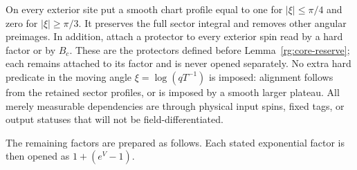 On every exterior site put a smooth chart profile equal to one for
$|\xi|\le\pi/4$ and zero for $|\xi|\ge\pi/3$.  It preserves the
full sector integral and removes other angular preimages.  In addition,
attach a protector to every exterior spin read by a hard factor or by
$B_c$.  These are the protectors defined before Lemma~\ref{rg:core-reserve};
each remains attached to its factor and is never opened separately.  No extra hard predicate in the moving angle
$\xi=\log(qT^{-1})$ is imposed: alignment follows from the retained
sector profiles, or is imposed by a smooth larger plateau.  All merely
measurable dependencies are through physical input spins, fixed tags,
or output statuses that will not be field-differentiated.

The remaining factors are prepared as follows.  Each stated
exponential factor is then opened as $1+(e^V-1)$.
